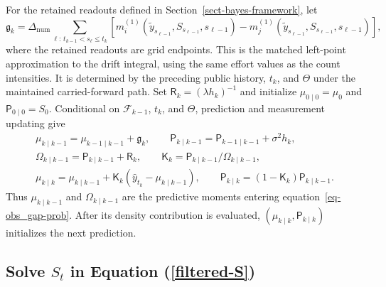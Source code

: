 \documentclass[mnsc]{informs3}
\begin{document}
\begin{APPENDICES}
For the retained readouts defined in Section~\ref{sect-bayes-framework}, let
\[
{\mathfrak g_k=
\Delta_{\mathrm{num}}\sum_{\ell:\,t_{k-1}<s_\ell\leq t_k}
\left[m_i^{(1)}(\tilde y_{s_{\ell-1}},S_{s_{\ell-1}},s_{\ell-1})
-m_j^{(1)}(\tilde y_{s_{\ell-1}},S_{s_{\ell-1}},s_{\ell-1})\right],}
\]
{where the retained readouts are grid endpoints. This is the matched left-point approximation to the drift integral, using the same effort values as the count intensities. It is determined by the preceding public history, $t_k$, and $\Theta$ under the maintained carried-forward path.} Set $\mathsf R_k=(\lambda h_k)^{-1}$ and initialize $\mu_{0\mid0}=\mu_0$ and $\mathsf P_{0\mid0}=S_0$. Conditional on $\mathcal F_{k-1}$, $t_k$, and $\Theta$, prediction and measurement updating give
\[
\begin{gathered}
\mu_{k\mid k-1}=\mu_{k-1\mid k-1}+\mathfrak g_k,\qquad
\mathsf P_{k\mid k-1}=\mathsf P_{k-1\mid k-1}+\sigma^2h_k,\\
\Omega_{k\mid k-1}=\mathsf P_{k\mid k-1}+\mathsf R_k,\qquad
\mathsf K_k=\mathsf P_{k\mid k-1}/\Omega_{k\mid k-1},\\
\mu_{k\mid k}=\mu_{k\mid k-1}
+\mathsf K_k(\hat y_{t_k}-\mu_{k\mid k-1}),\qquad
\mathsf P_{k\mid k}=(1-\mathsf K_k)\mathsf P_{k\mid k-1}.
\end{gathered}
\]
Thus $\mu_{k\mid k-1}$ and $\Omega_{k\mid k-1}$ are the predictive moments entering equation~\eqref{eq-obs_gap-prob}. After its density contribution is evaluated, $(\mu_{k\mid k},\mathsf P_{k\mid k})$ initializes the next prediction.

\subsection{Solve $S_t$ in Equation (\ref{filtered-S})}\label{app-S-equ}


\end{APPENDICES}
\end{document}
